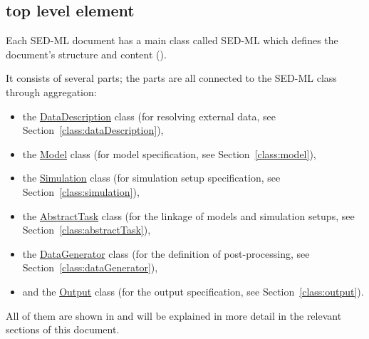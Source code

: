 \subsection{ top level element}
\label{class:sed-ml}
Each SED-ML \currentLV document has a main class called SED-ML which defines the document's structure and content ().

It consists of several parts; the parts are all connected to the SED-ML class through aggregation: 
\begin{itemize}
	\item the \hyperref[class:dataDescription]{DataDescription} class (for resolving external data, see Section~\ref{class:dataDescription}), 
	\item the \hyperref[class:model]{Model} class (for model specification, see Section~\ref{class:model}), 
	\item the \hyperref[class:simulation]{Simulation} class (for simulation setup specification, see Section~\ref{class:simulation}), 
	\item the \hyperref[class:abstractTask]{AbstractTask} class (for the linkage of models and simulation setups, see Section~\ref{class:abstractTask}), 
	\item the \hyperref[class:dataGenerator]{DataGenerator} class (for the definition of post-processing, see Section~\ref{class:dataGenerator}),
	\item and the \hyperref[class:output]{Output} class (for the output specification, see Section~\ref{class:output}).
\end{itemize}

All of them are shown in  and will be explained in more detail in the relevant sections of this document.



